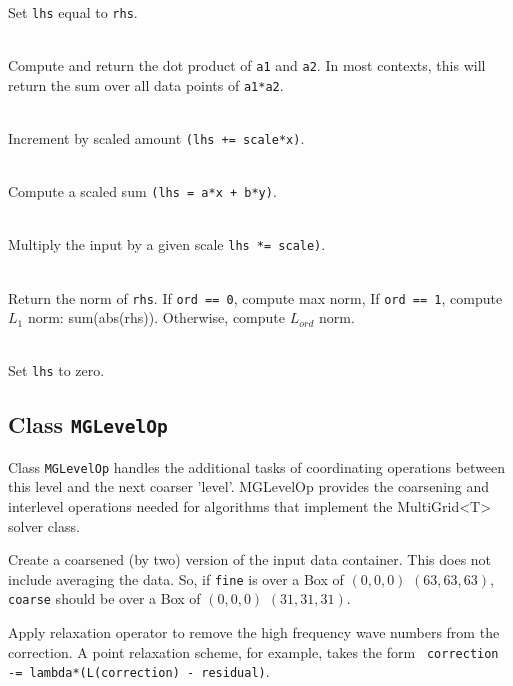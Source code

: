 \begin{itemize}
\begin{itemize}
\begin{itemize}
\begin{itemize}
\begin{itemize}
\begin{itemize}
\begin{itemize}
\begin{itemize}
\\ Set {\tt lhs} equal to {\tt rhs}.


\\ Compute and return the dot product of {\tt a1} and {\tt a2}.
In most contexts, this will return the sum over all data points of
{\tt a1*a2}. 


\\ Increment by scaled amount {\tt (lhs += scale*x)}.


\
\\Compute a scaled sum {\tt (lhs = a*x + b*y)}.


\\  Multiply the input by a given scale {\tt lhs *= scale)}.

\\ Return the norm of {\tt rhs}.
 If {\tt ord == 0}, compute max norm, If {\tt ord == 1}, compute
 $L_1$ norm: sum(abs(rhs)). Otherwise, compute $L_{ord}$ norm.


\\ Set {\tt lhs} to zero.
\ei


\subsection{Class {\tt MGLevelOp}}

Class {\tt MGLevelOp} handles the additional tasks of coordinating
operations between this level and the next coarser 'level'. 
{\bt MGLevelOp} provides the coarsening and interlevel operations
needed for algorithms that  implement the {\bt MultiGrid<T>} solver class.

\begin{itemize}

 Create a coarsened (by two) version of the input data container.
This does not include averaging the data.
So, if {\tt fine} is over a Box of $(0,0,0)$ $(63,63,63)$, {\tt
 coarse} should be over a Box of $(0,0,0)$ $(31,31,31)$. 


 Apply relaxation operator to remove the high frequency wave numbers
 from the correction.
 A point relaxation scheme, for example, takes the form \mbox{ {\tt
 correction -= lambda*(L(correction) - residual)}}. 


\end{itemize}
\end{itemize}
\end{itemize}
\end{itemize}
\end{itemize}
\end{itemize}
\end{itemize}
\end{itemize}
\end{itemize}
